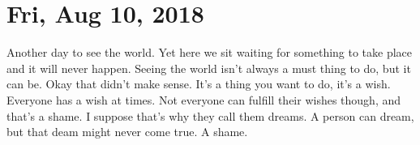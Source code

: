 \section{Fri, Aug 10, 2018}

Another day to see the world. Yet here we sit waiting for something to take place and
it will never happen. Seeing the world isn't always a must thing to do, but it can
be. Okay that didn't make sense. It's a thing you want to do, it's a wish. Everyone
has a wish at times. Not everyone can fulfill their wishes though, and that's a
shame. I suppose that's why they call them dreams. A person can dream, but that deam
might never come true. A shame.